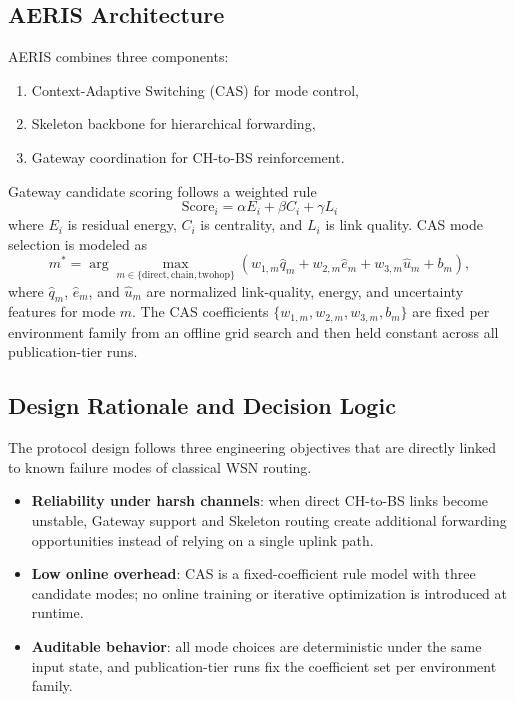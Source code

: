 ﻿\documentclass[sensors,article,submit,moreauthors,pdftex]{Definitions/mdpi}
\begin{document}
\subsection{AERIS Architecture}
AERIS combines three components:
\begin{enumerate}
\item Context-Adaptive Switching (CAS) for mode control,
\item Skeleton backbone for hierarchical forwarding,
\item Gateway coordination for CH-to-BS reinforcement.
\end{enumerate}
Gateway candidate scoring follows a weighted rule
\begin{equation}
\mathrm{Score}_i = \alpha E_i + \beta C_i + \gamma L_i
\end{equation}
where $E_i$ is residual energy, $C_i$ is centrality, and $L_i$ is link quality.
CAS mode selection is modeled as
\begin{equation}
m^{*}=\arg\max_{m\in\{\mathrm{direct},\mathrm{chain},\mathrm{twohop}\}}
\left(w_{1,m}\hat{q}_{m}+w_{2,m}\hat{e}_{m}+w_{3,m}\hat{u}_{m}+b_m\right),
\end{equation}
where $\hat{q}_{m}$, $\hat{e}_{m}$, and $\hat{u}_{m}$ are normalized link-quality, energy, and uncertainty features for mode $m$.
The CAS coefficients $\{w_{1,m}, w_{2,m}, w_{3,m}, b_m\}$ are fixed per environment family from an offline grid search and then held constant across all publication-tier runs.

\subsection{Design Rationale and Decision Logic}
The protocol design follows three engineering objectives that are directly linked to known failure modes of classical WSN routing.
\begin{itemize}
\item \textbf{Reliability under harsh channels}: when direct CH-to-BS links become unstable, Gateway support and Skeleton routing create additional forwarding opportunities instead of relying on a single uplink path.
\item \textbf{Low online overhead}: CAS is a fixed-coefficient rule model with three candidate modes; no online training or iterative optimization is introduced at runtime.
\item \textbf{Auditable behavior}: all mode choices are deterministic under the same input state, and publication-tier runs fix the coefficient set per environment family.
\end{itemize}
\end{document}
